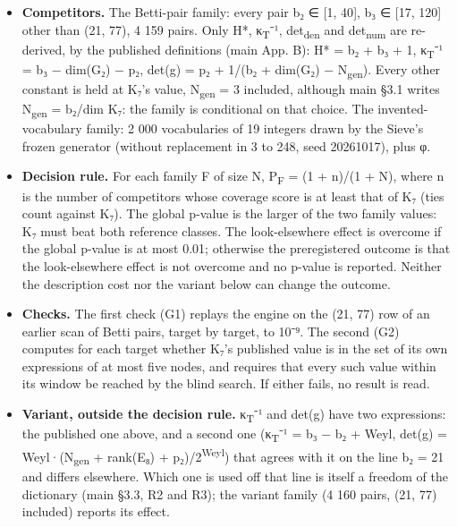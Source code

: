 \documentclass[11pt,a4paper]{article}
\begin{document}
\begin{itemize}
\item
  \textbf{Competitors.} The Betti-pair family: every pair b₂ ∈ {[}1, 40{]}, b₃ ∈ {[}17, 120{]} other than (21, 77), 4 159 pairs. Only H*, κ\textsubscript{T}⁻¹, det\textsubscript{den} and det\textsubscript{num} are re-derived, by the published definitions (main App. B): H* = b₂ + b₃ + 1, κ\textsubscript{T}⁻¹ = b₃ − dim(G₂) − p₂, det(g) = p₂ + 1/(b₂ + dim(G₂) − N\textsubscript{gen}). Every other constant is held at K₇'s value, N\textsubscript{gen} = 3 included, although main §3.1 writes N\textsubscript{gen} = b₂/dim K₇: the family is conditional on that choice. The invented-vocabulary family: 2 000 vocabularies of 19 integers drawn by the Sieve's frozen generator (without replacement in 3 to 248, seed 20261017), plus φ.
\item
  \textbf{Decision rule.} For each family F of size N, P\textsubscript{F} = (1 + n)/(1 + N), where n is the number of competitors whose coverage score is at least that of K₇ (ties count against K₇). The global p-value is the larger of the two family values: K₇ must beat both reference classes. The look-elsewhere effect is overcome if the global p-value is at most 0.01; otherwise the preregistered outcome is that the look-elsewhere effect is not overcome and no p-value is reported. Neither the description cost nor the variant below can change the outcome.
\item
  \textbf{Checks.} The first check (G1) replays the engine on the (21, 77) row of an earlier scan of Betti pairs, target by target, to 10⁻⁹. The second (G2) computes for each target whether K₇'s published value is in the set of its own expressions of at most five nodes, and requires that every such value within its window be reached by the blind search. If either fails, no result is read.
\item
  \textbf{Variant, outside the decision rule.} κ\textsubscript{T}⁻¹ and det(g) have two expressions: the published one above, and a second one (κ\textsubscript{T}⁻¹ = b₃ − b₂ + Weyl, det(g) = Weyl·(N\textsubscript{gen} + rank(E₈) + p₂)/2\textsuperscript{Weyl}) that agrees with it on the line b₂ = 21 and differs elsewhere. Which one is used off that line is itself a freedom of the dictionary (main §3.3, R2 and R3); the variant family (4 160 pairs, (21, 77) included) reports its effect.
\end{itemize}
\end{document}
